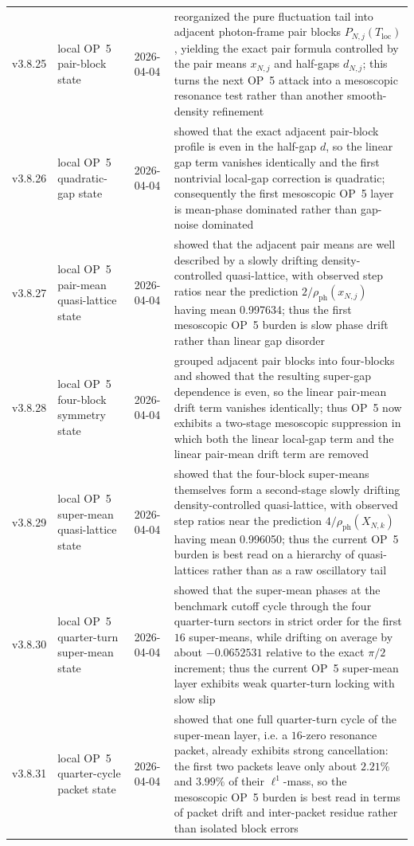 {\begin{longtable}{|p{}|p{}|p{}|p{}|}
v3.8.25 & local OP~5 pair-block state & 2026-04-04 & reorganized the pure fluctuation tail into adjacent photon-frame pair blocks \(P_{N,j}(T_{\mathrm{loc}})\), yielding the exact pair formula controlled by the pair means \(x_{N,j}\) and half-gaps \(d_{N,j}\); this turns the next OP~5 attack into a mesoscopic resonance test rather than another smooth-density refinement \\
v3.8.26 & local OP~5 quadratic-gap state & 2026-04-04 & showed that the exact adjacent pair-block profile is even in the half-gap \(d\), so the linear gap term vanishes identically and the first nontrivial local-gap correction is quadratic; consequently the first mesoscopic OP~5 layer is mean-phase dominated rather than gap-noise dominated \\
v3.8.27 & local OP~5 pair-mean quasi-lattice state & 2026-04-04 & showed that the adjacent pair means are well described by a slowly drifting density-controlled quasi-lattice, with observed step ratios near the prediction \(2/\rho_{\mathrm{ph}}(x_{N,j})\) having mean 0.997634; thus the first mesoscopic OP~5 burden is slow phase drift rather than linear gap disorder \\
v3.8.28 & local OP~5 four-block symmetry state & 2026-04-04 & grouped adjacent pair blocks into four-blocks and showed that the resulting super-gap dependence is even, so the linear pair-mean drift term vanishes identically; thus OP~5 now exhibits a two-stage mesoscopic suppression in which both the linear local-gap term and the linear pair-mean drift term are removed \\
v3.8.29 & local OP~5 super-mean quasi-lattice state & 2026-04-04 & showed that the four-block super-means themselves form a second-stage slowly drifting density-controlled quasi-lattice, with observed step ratios near the prediction \(4/\rho_{\mathrm{ph}}(X_{N,k})\) having mean 0.996050; thus the current OP~5 burden is best read on a hierarchy of quasi-lattices rather than as a raw oscillatory tail \\
v3.8.30 & local OP~5 quarter-turn super-mean state & 2026-04-04 & showed that the super-mean phases at the benchmark cutoff cycle through the four quarter-turn sectors in strict order for the first \(16\) super-means, while drifting on average by about \(-0.0652531\) relative to the exact \(\pi/2\) increment; thus the current OP~5 super-mean layer exhibits weak quarter-turn locking with slow slip \\
v3.8.31 & local OP~5 quarter-cycle packet state & 2026-04-04 & showed that one full quarter-turn cycle of the super-mean layer, i.e. a \(16\)-zero resonance packet, already exhibits strong cancellation: the first two packets leave only about \(2.21\%\) and \(3.99\%\) of their \(\ell^1\)-mass, so the mesoscopic OP~5 burden is best read in terms of packet drift and inter-packet residue rather than isolated block errors \\

\end{longtable}}
